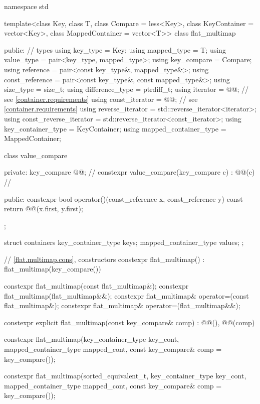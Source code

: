 \begin{codeblock}
namespace std {
  template<class Key, class T, class Compare = less<Key>,
           class KeyContainer = vector<Key>, class MappedContainer = vector<T>>
  class flat_multimap {
  public:
    // types
    using key_type               = Key;
    using mapped_type            = T;
    using value_type             = pair<key_type, mapped_type>;
    using key_compare            = Compare;
    using reference              = pair<const key_type&, mapped_type&>;
    using const_reference        = pair<const key_type&, const mapped_type&>;
    using size_type              = size_t;
    using difference_type        = ptrdiff_t;
    using iterator               = @@;     // see \ref{container.requirements}
    using const_iterator         = @@;     // see \ref{container.requirements}
    using reverse_iterator       = std::reverse_iterator<iterator>;
    using const_reverse_iterator = std::reverse_iterator<const_iterator>;
    using key_container_type     = KeyContainer;
    using mapped_container_type  = MappedContainer;

    class value_compare {
    private:
      key_compare @@;                                         // \expos
      constexpr value_compare(key_compare c) : @@(c) { }      // \expos

    public:
      constexpr bool operator()(const_reference x, const_reference y) const {
        return @@(x.first, y.first);
      }
    };

    struct containers {
      key_container_type keys;
      mapped_container_type values;
    };

    // \ref{flat.multimap.cons}, constructors
    constexpr flat_multimap() : flat_multimap(key_compare()) { }

    constexpr flat_multimap(const flat_multimap&);
    constexpr flat_multimap(flat_multimap&&);
    constexpr flat_multimap& operator=(const flat_multimap&);
    constexpr flat_multimap& operator=(flat_multimap&&);

    constexpr explicit flat_multimap(const key_compare& comp)
      : @@(), @@(comp) { }

    constexpr flat_multimap(key_container_type key_cont, mapped_container_type mapped_cont,
                            const key_compare& comp = key_compare());

    constexpr flat_multimap(sorted_equivalent_t,
                            key_container_type key_cont, mapped_container_type mapped_cont,
                            const key_compare& comp = key_compare());

}}
\end{codeblock}
